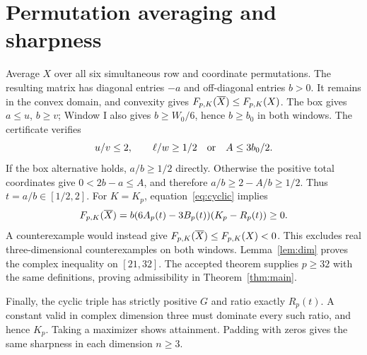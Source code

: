 \documentclass[11pt,a4paper]{article}
\theoremstyle{remark}\newtheorem{remark}[theorem]{Remark}
\begin{document}
\section{Permutation averaging and sharpness}\label{sec:finish}
Average $X$ over all six simultaneous row and coordinate permutations.
The resulting matrix has diagonal entries $-a$ and off-diagonal entries
$b>0$. It remains in the convex domain, and convexity gives
$F_{p,K}(\overline X)\le F_{p,K}(X)$. The box gives $a\le u$, $b\ge v$;
Window I also gives $b\ge W_0/6$, hence $b\ge b_0$ in both windows.
The certificate verifies
\begin{equation}\label{eq:orbit}
u/v\le2,\qquad \ell/w\ge1/2\quad\hbox{or}\quad A\le3b_0/2.
\end{equation}
If the box alternative holds, $a/b\ge1/2$ directly. Otherwise the
positive total coordinates give $0<2b-a\le A$, and therefore
$a/b\ge2-A/b\ge1/2$. Thus $t=a/b\in[1/2,2]$.
For $K=K_p$, equation~\eqref{eq:cyclic} implies
\[
F_{p,K}(\overline X)=b(6A_p(t)-3B_p(t))(K_p-R_p(t))\ge0.
\]
A counterexample would instead give $F_{p,K}(\overline X)\le F_{p,K}(X)<0$.
This excludes real three-dimensional counterexamples on both windows.
Lemma~\ref{lem:dim} proves the complex inequality on $[21,32]$.
The accepted theorem \cite{solution32} supplies $p\ge32$ with the same
definitions, proving admissibility in Theorem~\ref{thm:main}.

Finally, the cyclic triple has strictly positive $G$ and ratio exactly
$R_p(t)$. A constant valid in complex dimension three must dominate every
such ratio, and hence $K_p$. Taking a maximizer shows attainment. Padding
with zeros gives the same sharpness in each dimension $n\ge3$.
\end{document}
